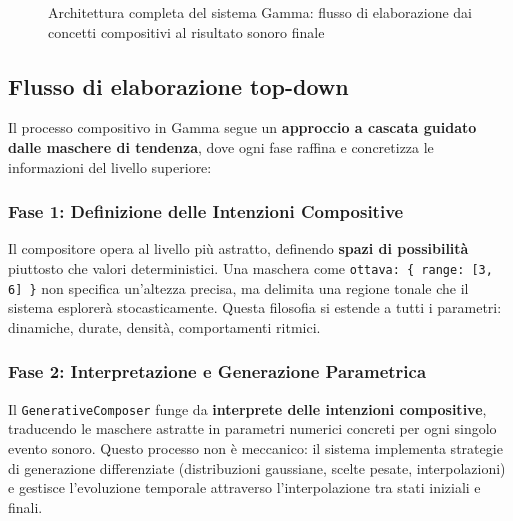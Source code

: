 \begin{figure}[htbp]
\caption{Architettura completa del sistema Gamma: flusso di elaborazione dai concetti compositivi al risultato sonoro finale}
\label{fig:gamma_architecture}
\end{figure}

\subsection{Flusso di elaborazione top-down}

Il processo compositivo in Gamma segue un \textbf{approccio a cascata guidato dalle maschere di tendenza}, dove ogni fase raffina e concretizza le informazioni del livello superiore:

\subsubsection{Fase 1: Definizione delle Intenzioni Compositive}
Il compositore opera al livello più astratto, definendo \textbf{spazi di possibilità} piuttosto che valori deterministici. Una maschera come \texttt{ottava: \{ range: [3, 6] \}} non specifica un'altezza precisa, ma delimita una regione tonale che il sistema esplorerà stocasticamente. Questa filosofia si estende a tutti i parametri: dinamiche, durate, densità, comportamenti ritmici.

\subsubsection{Fase 2: Interpretazione e Generazione Parametrica}
Il \texttt{GenerativeComposer} funge da \textbf{interprete delle intenzioni compositive}, traducendo le maschere astratte in parametri numerici concreti per ogni singolo evento sonoro. Questo processo non è meccanico: il sistema implementa strategie di generazione differenziate (distribuzioni gaussiane, scelte pesate, interpolazioni) e gestisce l'evoluzione temporale attraverso l'interpolazione tra stati iniziali e finali.

